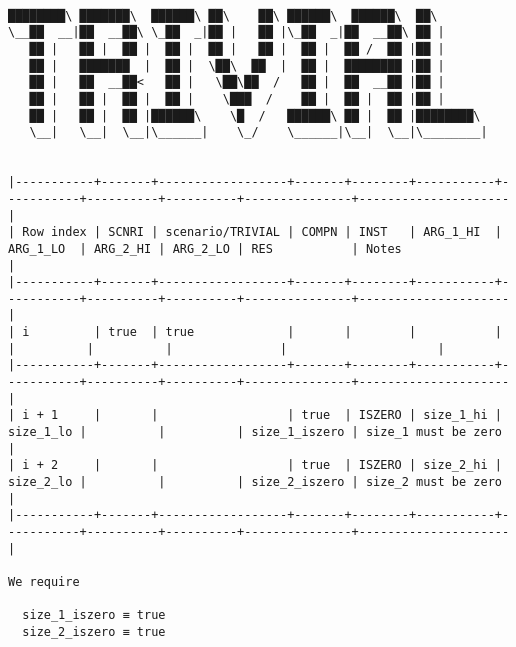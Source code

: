 \documentclass[varwidth=\maxdimen,margin=0.5cm,multi={verbatim}]{standalone}
\begin{document}
\begin{verbatim}

████████\ ███████\  ██████\ ██\    ██\ ██████\  ██████\  ██\
\__██  __|██  __██\ \_██  _|██ |   ██ |\_██  _|██  __██\ ██ |
   ██ |   ██ |  ██ |  ██ |  ██ |   ██ |  ██ |  ██ /  ██ |██ |
   ██ |   ███████  |  ██ |  \██\  ██  |  ██ |  ████████ |██ |
   ██ |   ██  __██<   ██ |   \██\██  /   ██ |  ██  __██ |██ |
   ██ |   ██ |  ██ |  ██ |    \███  /    ██ |  ██ |  ██ |██ |
   ██ |   ██ |  ██ |██████\    \█  /   ██████\ ██ |  ██ |████████\
   \__|   \__|  \__|\______|    \_/    \______|\__|  \__|\________|


|-----------+-------+------------------+-------+--------+-----------+-----------+----------+----------+---------------+---------------------|
| Row index | SCNRI | scenario/TRIVIAL | COMPN | INST   | ARG_1_HI  | ARG_1_LO  | ARG_2_HI | ARG_2_LO | RES           | Notes               |
|-----------+-------+------------------+-------+--------+-----------+-----------+----------+----------+---------------+---------------------|
| i         | true  | true             |       |        |           |           |          |          |               |                     |
|-----------+-------+------------------+-------+--------+-----------+-----------+----------+----------+---------------+---------------------|
| i + 1     |       |                  | true  | ISZERO | size_1_hi | size_1_lo |          |          | size_1_iszero | size_1 must be zero |
| i + 2     |       |                  | true  | ISZERO | size_2_hi | size_2_lo |          |          | size_2_iszero | size_2 must be zero |
|-----------+-------+------------------+-------+--------+-----------+-----------+----------+----------+---------------+---------------------|

We require

  size_1_iszero ≡ true
  size_2_iszero ≡ true

\end{verbatim}
\end{document}
